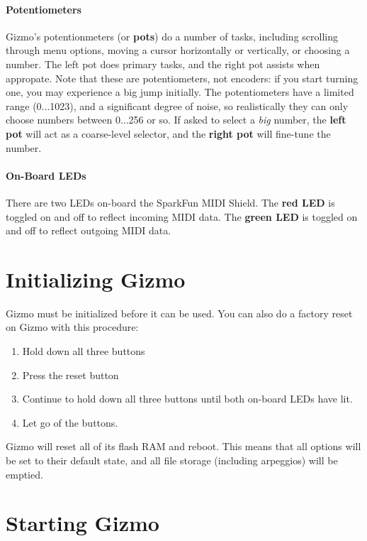 \documentclass{article}
\begin{document}
\paragraph{Potentiometers}

Gizmo's potentionmeters  (or {\bf pots}) do a number of tasks, including scrolling through menu options, moving a cursor horizontally or vertically, or choosing a number.  The left pot does primary tasks, and the right pot assists when appropate.  Note that these are potentiometers, not encoders: if you start turning one, you may experience a big jump initially.  The potentiometers have a limited range (0...1023), and a significant degree of noise, so realistically they can only choose numbers between 0...256 or so.  If asked to select a {\it big} number, the {\bf left pot} will act as a coarse-level selector, and the {\bf right pot} will fine-tune the number.


\paragraph{On-Board LEDs}

There are two LEDs on-board the SparkFun MIDI Shield.  The {\bf red LED} is toggled on and off to reflect incoming MIDI data.  The {\bf green LED} is toggled on and off to reflect outgoing MIDI data.  

\section{Initializing Gizmo}

Gizmo must be initialized before it can be used.  You can also do a factory reset on Gizmo with this procedure:

\begin{enumerate}
\item Hold down all three buttons
\item Press the reset button
\item Continue to hold down all three buttons until both on-board LEDs have lit.
\item Let go of the buttons.
\end{enumerate}

Gizmo will reset all of its flash RAM and reboot.  This means that all options will be set to their default state, and all file storage (including arpeggios) will be emptied.

\section{Starting Gizmo}
\end{document}
